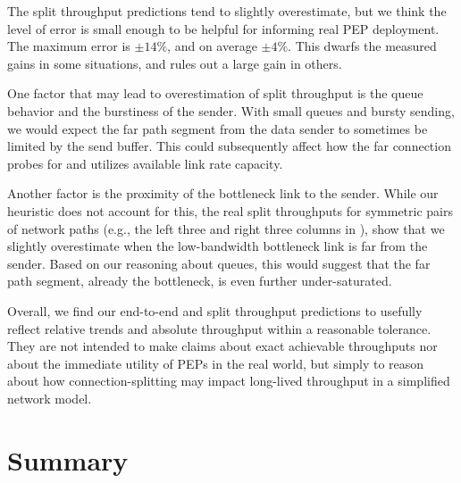 The split throughput predictions tend to slightly overestimate, but we think
the level of error is small enough to be helpful for informing real PEP
deployment. The maximum error is $\pm14\%$, and on average $\pm4\%$. This
dwarfs the measured gains in some situations, and rules out a large gain in
others.

One factor that may lead to overestimation of split throughput is the queue
behavior and the burstiness of the sender. With small queues and bursty
sending, we would expect the far path segment from the data sender to sometimes
be limited by the send buffer. This could subsequently affect how the far
connection probes for and utilizes available link rate capacity.

Another factor is the proximity of the bottleneck link to the sender. While
our heuristic does not account for this, the real split throughputs for
symmetric pairs of network paths (e.g., the left three and right three columns
in ), show that we slightly overestimate
when the low-bandwidth bottleneck link is far from the sender.
Based on our reasoning about queues, this would suggest that the far path
segment, already the bottleneck, is even further under-saturated.

Overall, we find our end-to-end and split throughput predictions to usefully
reflect relative trends and absolute throughput within a
reasonable tolerance. They are not intended to make claims about exact achievable
throughputs nor about the immediate utility of PEPs in the real world,
but simply to reason about how connection-splitting may impact
long-lived throughput in a simplified network model.

\section{Summary}
\label{sec:splitting:summary}
